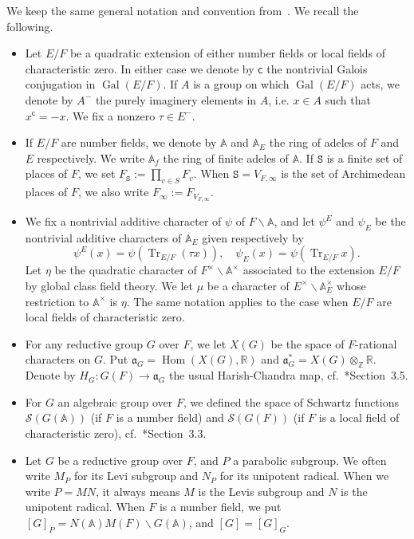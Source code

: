\documentclass[letterpaper,11pt]{amsart}
\newcommand{\fa}{\mathfrak{a}}
\newcommand{\bA}{\mathbb{A}}
\newcommand{\R}{\mathbb{R}}
\newcommand{\Z}{\mathbb{Z}}
\newcommand{\cS}{\mathcal{S}}
\newcommand{\tS}{\mathtt{S}}
\newcommand{\bs}{\backslash}
\newcommand{\<}{\negthickspace}
\DeclareMathOperator{\Gal}{Gal}
\DeclareMathOperator{\Tr}{Tr}
\DeclareMathOperator{\Hom}{Hom}
\theoremstyle{definition}
\theoremstyle{plain}
\theoremstyle{remark}
\numberwithin{equation}{section}
\begin{document}
We keep the same general notation and convention from~\cite{BLX1}. We recall the following.
\begin{itemize}
\item Let $E/F$ be a quadratic extension of either number fields or local fields of characteristic zero. In either case we denote by
$\textsf{c}$ the nontrivial Galois conjugation in $\Gal(E/F)$. If $A$ is a group on which $\Gal(E/F)$ acts, we denote by $A^-$ the purely imaginery elements in $A$, i.e. $x \in A$ such that $x^{\textsf{c}} = -x$. We fix a nonzero $\tau \in
E^-$. 

\item If $E/F$ are number fields, we denote by $\bA$ and $\bA_E$ the ring of adeles of $F$ and $E$ respectively. We write $\bA_{f}$
the ring of finite adeles of $\bA$. If $\tS$ is a finite set of places of $F$, we set $F_\tS := \prod_{v \in S} F_v$. When $\tS = V_{F,\infty}$ is the set of Archimedean places of $F$, we also write $F_{\infty} := F_{V_{F,\infty}}$. 

\item We fix a nontrivial additive character of $\psi$ of $F\bs \bA$, and let
$\psi^E$ and $\psi_E$ be the nontrivial additive characters of $\bA_E$ given
respectively by
    \[
    \psi^E(x) = \psi(\Tr_{E/F}(\tau x)), \quad \psi_E(x) = \psi(\Tr_{E/F} x).
    \]
Let $\eta$ be the quadratic character of $F^\times \bs \bA^\times$
associated to the extension $E/F$ by global class field theory. We let $\mu$
be a character of $E^\times \bs \bA_E^\times$ whose restriction to $\bA^\times$ is $\eta$. The same notation applies to the case when $E/F$ are local fields of characteristic zero.

\item For any reductive group $G$ over $F$, we let $X(G)$ be the space of $F$-rational characters on $G$. Put $\fa_G = \Hom(X(G), \R)$ and $\fa_G^* = X(G) \otimes_{\Z} \R$. Denote by $H_G: G(F) \to \fa_G$ the usual Harish-Chandra map, cf.~\cite{BLX1}*{Section~3.5}.

\item For $G$ an algebraic group over $F$, we defined the space of Schwartz functions $\cS(G(\bA))$ (if $F$ is a number field) and $\cS(G(F))$ (if $F$ is a local field of characteristic zero), cf.~\cite{BLX1}*{Section~3.3}.

\item Let $G$ be a reductive group over $F$, and $P$ a parabolic subgroup. We often write $M_P$ for its Levi subgroup and $N_P$ for its unipotent radical. When we write $P = MN$, it always means $M$ is the Levis subgroup and $N$ is the unipotent radical.  When $F$ is a number field, we put $[G]_P =  N(\bA)M(F) \bs G(\bA)$, and  $[G] = [G]_G$.


\end{itemize}
\end{document}

